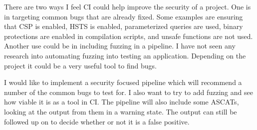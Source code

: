 	There are two ways I feel CI could help improve the security of a project. One is in targeting common bugs that are already fixed. Some examples are ensuring that CSP is enabled, HSTS is enabled, parameterized queries are used, binary protections are enabled in compilation scripts, and unsafe functions are not used. Another use could be in including fuzzing in a pipeline. I have not seen any research into automating fuzzing into testing an application. Depending on the project it could be a very useful tool to find bugs.

	I would like to implement a security focused pipeline which will recommend a number of the common bugs to test for. I also want to try to add fuzzing and see how viable it is as a tool in CI. The pipeline will also include some ASCATs, looking at the output from them in a warning state. The output can still be followed up on to decide whether or not it is a false positive.


